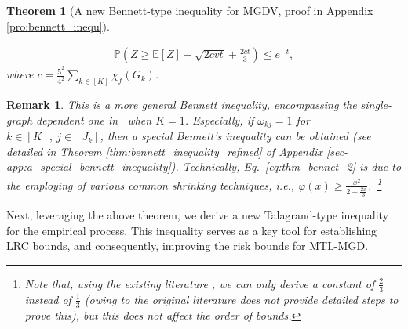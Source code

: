 \documentclass{article}
\def\eE{\mathbb{E}}
\def\pP{\mathbb{P}}
\newtheorem{theorem}{Theorem}
\newtheorem*{remark}{Remark}
\begin{document}
\begin{theorem}[A new Bennett-type inequality for MGDV, proof in Appendix \ref{pro:bennett_inequ}]
\begin{enumerate}[(1)]
                \begin{align}
                \label{eq:thm_bennet_2}
                    \pP (Z   \geq     \eE[Z] + \sqrt{2cvt} + \frac{2ct}{3}) \leq e^{-t} ,
                \end{align}
            where $c = \frac{5^2}{4^2} \sum_{k \in [K]} \chi_{f} (G_k)$.
        \end{enumerate}  
    \end{theorem}
\begin{remark}
    This is a more general Bennett inequality, encompassing the single-graph dependent one in~\cite{ralaivola2015entropy} when $K = 1$. 
    Especially, if $\omega_{kj} = 1$ for $k \in [K], ~j \in [J_k]$, then a special Bennett's inequality can be obtained (see detailed in Theorem \ref{thm:bennett_inequality_refined} of Appendix \ref{sec-app:a_special_bennett_inequality}). 
    Technically, Eq.~\eqref{eq:thm_bennet_2} is due to the employing of various common shrinking techniques, i.e., $\varphi(x) \geq \frac{x^2}{2+\frac{2x}{3}}$.~\footnote{Note that, using the existing literature 
    \cite{yousefi18,watkins2023optimistic}, we can only derive a constant of $\frac{2}{3}$ instead of $\frac{1}{3}$ (owing to the original literature \cite{bousquet2002bennett} does not provide detailed steps to prove this), but this does not affect the order of bounds.}
\end{remark}
Next, leveraging the above theorem, we derive a new Talagrand-type inequality for the empirical process. This inequality serves as a key tool for establishing LRC bounds, and consequently, improving the risk bounds for MTL-MGD.
\end{document}
